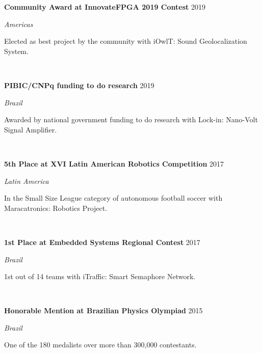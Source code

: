 \documentclass[letterpaper,10pt]{article}
\newcommand{\entry}[4]{

\begin{minipage}[t]{.15\textwidth}
\end{minipage}
\hfill\vline\hfill 
\begin{minipage}[t]{0.95\textwidth}
#2 \hfill \textsc{#1}

\textit{#3}

\footnotesize{#4}
\end{minipage}\\\vspace{.25cm}}
\begin{document}
\entry{2019}{\textbf{Community Award at InnovateFPGA 2019 Contest}}{Americas}{
	Elected as best project by the community with iOwlT: Sound Geolocalization System.
}

\entry{2019}{\textbf{PIBIC/CNPq funding to do research}}{Brazil}{
	Awarded by national government funding to do research with Lock-in: Nano-Volt Signal Amplifier.	
}

\entry{2017}{\textbf{5th Place at XVI Latin American Robotics Competition}}{Latin America}{
	In the Small Size League category of autonomous football soccer with Maracatronics: Robotics Project.
}

\entry{2017}{\textbf{1st Place at Embedded Systems Regional Contest}}{Brazil}{
	1st out of 14 teams with iTraffic: Smart Semaphore Network.
}

\entry{2015}{\textbf{Honorable Mention at Brazilian Physics Olympiad}}{Brazil}{
	One of the 180 medalists over more than 300,000 contestants.
}

\end{document}
